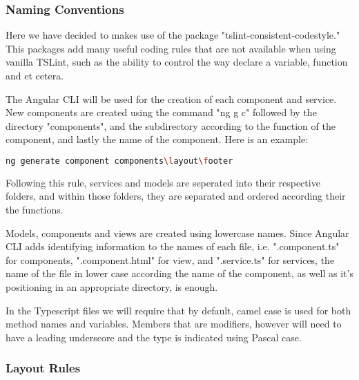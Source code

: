 \documentclass[11pt]{article}
\begin{document}
\subsubsection{Naming Conventions}

Here we have decided to makes use of the package "tslint-consistent-codestyle." This packages add many useful coding rules that are not available when using vanilla TSLint, such as the ability to control the way declare a variable, function and et cetera.\cite{Website:4}

The Angular CLI will be used for the creation of each component and service. New components are created using the command "ng g c" followed by the directory "components", and the subdirectory according to the function of the component, and lastly the name of the component. Here is an example:

\begin{lstlisting}[language=bash]
ng generate component components\layout\footer
\end{lstlisting}
Following this rule, services and models are seperated into their respective folders, and within those folders, they are separated and ordered according their the functions.\par
Models, components and views are created using lowercase names. Since Angular CLI adds identifying information to the names of each file, i.e. ".component.ts" for components, ".component.html" for view, and ".service.ts" for services, the name of the file in lower case according the name of the component, as well as it's positioning in an appropriate directory, is enough.\par


In the Typescript files we will require that by default, camel case is used for both method names and variables. Members that are modifiers, however will need to have a leading underscore and the type is indicated using Pascal case.


\subsubsection{Layout Rules}
\end{document}
